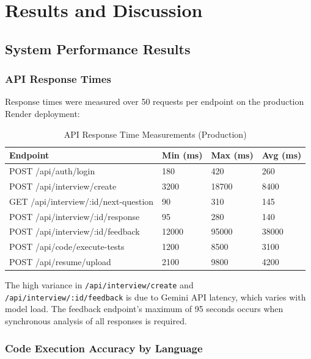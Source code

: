 \chapter{Results and Discussion}

\section{System Performance Results}

\subsection{API Response Times}

Response times were measured over 50 requests per endpoint on the production Render deployment:

\begin{table}[H]
\centering
\caption{API Response Time Measurements (Production)}
\vspace{8pt}
\begin{tabularx}{\textwidth}{|X|C{2.2cm}|C{2.2cm}|C{2.2cm}|}
\hline
\textbf{Endpoint} & \textbf{Min (ms)} & \textbf{Max (ms)} & \textbf{Avg (ms)} \\
\hline
POST /api/auth/login & 180 & 420 & 260 \\
\hline
POST /api/interview/create & 3200 & 18700 & 8400 \\
\hline
GET /api/interview/:id/next-question & 90 & 310 & 145 \\
\hline
POST /api/interview/:id/response & 95 & 280 & 140 \\
\hline
POST /api/interview/:id/feedback & 12000 & 95000 & 38000 \\
\hline
POST /api/code/execute-tests & 1200 & 8500 & 3100 \\
\hline
POST /api/resume/upload & 2100 & 9800 & 4200 \\
\hline
\end{tabularx}
\label{tab:responsetimes}
\end{table}

The high variance in \texttt{/api/interview/create} and \texttt{/api/interview/:id/feedback} is due to Gemini API latency, which varies with model load. The feedback endpoint's maximum of 95 seconds occurs when synchronous analysis of all responses is required.

\subsection{Code Execution Accuracy by Language}

